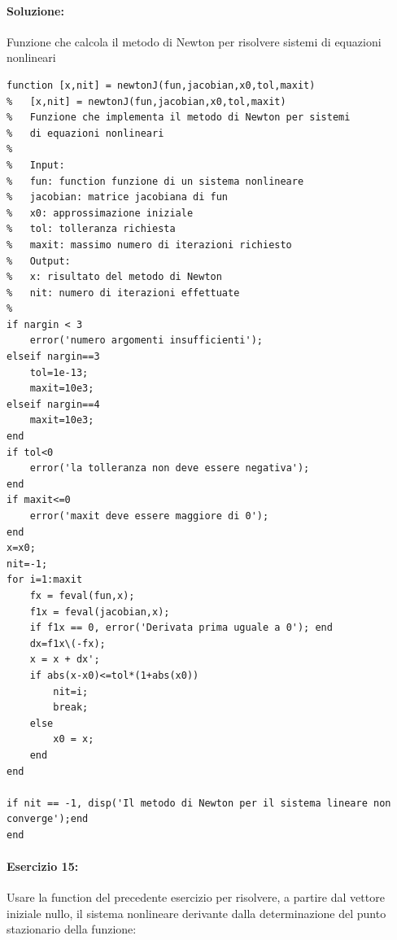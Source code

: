 \documentclass[12pt]{article}
\begin{document}
\paragraph{Soluzione:} Funzione che calcola  il metodo di Newton per risolvere sistemi di equazioni nonlineari
\begin{lstlisting}[frame=single]
function [x,nit] = newtonJ(fun,jacobian,x0,tol,maxit)
%   [x,nit] = newtonJ(fun,jacobian,x0,tol,maxit)
%   Funzione che implementa il metodo di Newton per sistemi 
%   di equazioni nonlineari
%   
%   Input:
%   fun: function funzione di un sistema nonlineare
%   jacobian: matrice jacobiana di fun
%   x0: approssimazione iniziale
%   tol: tolleranza richiesta
%   maxit: massimo numero di iterazioni richiesto
%   Output:
%   x: risultato del metodo di Newton
%   nit: numero di iterazioni effettuate
%
if nargin < 3
    error('numero argomenti insufficienti');
elseif nargin==3
    tol=1e-13;
    maxit=10e3;
elseif nargin==4
    maxit=10e3;
end
if tol<0
    error('la tolleranza non deve essere negativa');
end
if maxit<=0
    error('maxit deve essere maggiore di 0');
end
x=x0;
nit=-1;
for i=1:maxit
    fx = feval(fun,x);
    f1x = feval(jacobian,x);
    if f1x == 0, error('Derivata prima uguale a 0'); end
    dx=f1x\(-fx);
    x = x + dx';
    if abs(x-x0)<=tol*(1+abs(x0))
        nit=i;
        break;
    else
        x0 = x;
    end
end

if nit == -1, disp('Il metodo di Newton per il sistema lineare non converge');end
end    
\end{lstlisting}



\newpage
\paragraph{Esercizio 15:} Usare la function del precedente esercizio per risolvere, a partire dal vettore iniziale nullo, 
il sistema nonlineare derivante dalla determinazione del punto stazionario della funzione:
\end{document}
